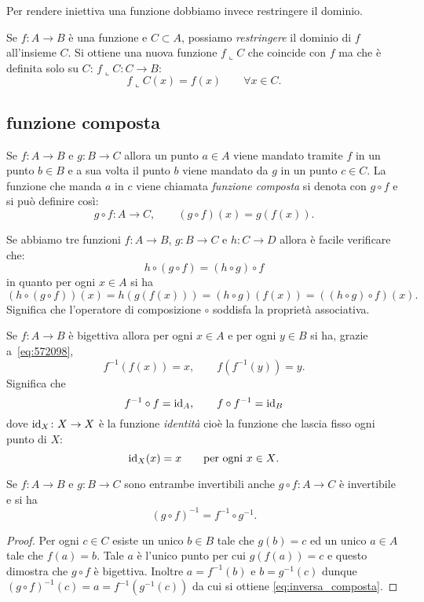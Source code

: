 Per rendere iniettiva una funzione dobbiamo invece restringere il dominio.

\begin{definition}[restrizione]
  \label{def:restrizione}%
  Se $f\colon A\to B$ è una funzione e $C\subset A$, possiamo 
  \emph{restringere} il dominio di $f$ all'insieme $C$.
  Si ottiene una nuova funzione $f\llcorner C$ che coincide con $f$
  ma che è definita solo su $C$: $f\llcorner C\colon C\to B$:
  \[
  f\llcorner C(x) = f(x)\qquad 
  \forall x \in C.
  \]
\end{definition}


\subsection{funzione composta}
%

Se $f\colon A\to B$ e $g\colon B\to C$ allora un punto $a\in A$ 
viene mandato tramite $f$ in un punto $b\in B$ e 
a sua volta il punto $b$ viene mandato da $g$ in un punto 
$c \in C$. 
La funzione che manda $a$ in $c$ viene chiamata 
\emph{funzione composta}%
%
 si denota con $g\circ f$ 
e si può definire così:
\[
g\circ f \colon A \to C, \qquad 
(g\circ f)(x) = g(f(x)).  
\]

Se abbiamo tre funzioni 
$f\colon A\to B$, $g\colon B\to C$ e $h\colon C\to D$ 
allora è facile verificare che:
\[
   h \circ (g\circ f) = (h\circ g) \circ f
\]
in quanto per ogni $x\in A$ si ha
\[
(h \circ (g\circ f)) (x) =
h(g(f(x))) = (h\circ g)(f(x)) = ((h\circ g) \circ f) (x).  
\]
Significa che l'operatore di composizione $\circ$
soddisfa la proprietà associativa.

Se $f\colon A\to B$ è bigettiva allora 
per ogni $x\in A$ e per ogni $y\in B$ si ha,
grazie a~\eqref{eq:572098},
\[
  f^{-1} (f(x)) = x,
  \qquad f(f^{-1}(y)) = y.
\]
Significa che 
\[
  f^{-1}\circ f = \mathrm{id}_A, 
  \qquad
  f\circ f^{-1} = \mathrm{id}_B
\] 
dove $\mathrm{id}_X\colon X\to X$
è la funzione 
\emph{identità}%
%
%
cioè la funzione 
che lascia fisso ogni punto di $X$:
%
\index{$\id$}%
\[
\mathrm{id}_X(x) = x \qquad \text{per ogni $x\in X$}.
\]

\begin{theorem}
Se $f\colon A\to B$ e $g\colon B\to C$ sono entrambe invertibili
anche $g\circ f\colon A\to C$ è invertibile e si ha 
\begin{equation}\label{eq:inversa_composta}
  (g\circ f)^{-1} = f^{-1}\circ g^{-1}.
\end{equation}
\end{theorem}
\begin{proof}    
Per ogni $c\in C$ esiste un unico $b\in B$ tale che $g(b)=c$ 
ed un unico $a\in A$ tale che $f(a)=b$. 
Tale $a$ è l'unico punto per cui $g(f(a))=c$ e questo dimostra che 
$g\circ f$ è bigettiva. Inoltre $a=f^{-1}(b)$ e $b=g^{-1}(c)$ 
dunque $(g\circ f)^{-1}(c) = a = f^{-1}(g^{-1}(c))$ da cui si ottiene 
\eqref{eq:inversa_composta}.
\end{proof}

